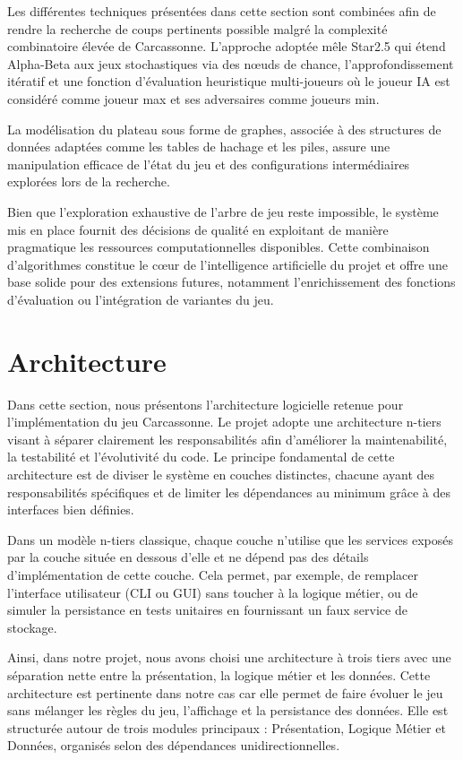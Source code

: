 \documentclass[11pt]{article}
\begin{document}
Les différentes techniques présentées dans cette section sont combinées 
afin de rendre la recherche de coups pertinents possible malgré la 
complexité combinatoire élevée de Carcassonne. L'approche adoptée mêle 
Star2.5 qui étend Alpha-Beta aux jeux stochastiques via des nœuds 
de chance, l'approfondissement itératif et une fonction d'évaluation 
heuristique multi-joueurs où le joueur IA est considéré comme joueur 
max et ses adversaires comme joueurs min.

La modélisation du plateau sous forme de graphes, associée à des 
structures de données adaptées comme les tables de hachage et les piles, 
assure une manipulation efficace de l'état du jeu et des configurations 
intermédiaires explorées lors de la recherche.

Bien que l'exploration exhaustive de l'arbre de jeu reste impossible, 
le système mis en place fournit des décisions de qualité en exploitant 
de manière pragmatique les ressources computationnelles disponibles. 
Cette combinaison d'algorithmes constitue le cœur de l'intelligence 
artificielle du projet et offre une base solide pour des extensions 
futures, notamment l'enrichissement des fonctions d'évaluation ou 
l'intégration de variantes du jeu.

\section{Architecture}
Dans cette section, nous présentons l'architecture logicielle retenue pour l'implémentation du jeu Carcassonne.
Le projet adopte une architecture n-tiers\cite{n_tier_architecture} visant à séparer clairement les responsabilités afin d'améliorer la maintenabilité, la testabilité et l'évolutivité du code.
Le principe fondamental de cette architecture est de diviser le système en couches distinctes, chacune ayant des responsabilités spécifiques et de limiter les dépendances au minimum grâce à des interfaces bien définies.

Dans un modèle n-tiers classique, chaque couche n'utilise que les services exposés par la couche située en dessous d'elle et ne dépend pas des détails d'implémentation de cette couche. Cela permet, par exemple, de remplacer l'interface utilisateur (CLI ou GUI) sans toucher à la logique métier, ou de simuler la persistance en tests unitaires en fournissant un faux service de stockage.

Ainsi, dans notre projet, nous avons choisi une architecture à trois tiers avec une séparation nette entre la présentation, la logique métier et les données.
Cette architecture est pertinente dans notre cas car elle permet de faire évoluer le jeu sans mélanger les règles du jeu, l'affichage et la persistance des données. Elle est structurée autour de trois modules principaux : Présentation, Logique Métier et Données, organisés selon des dépendances unidirectionnelles.
\end{document}
